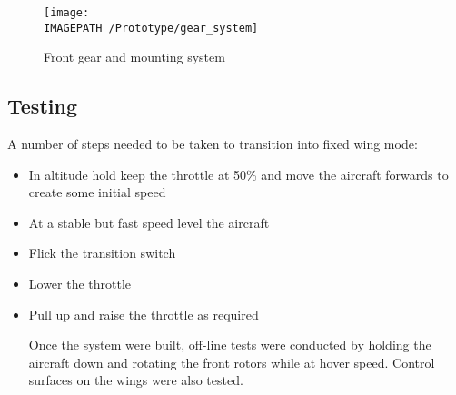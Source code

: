 \begin{figure}[!ht]
	\centering
	\texttt{[image: \\IMAGEPATH /Prototype/gear\_system]}
	\caption{Front gear and mounting system}
	\label{fig:gearsys}
\end{figure}

\subsection{Testing}
A number of steps needed to be taken to transition into fixed wing mode: 

\begin{itemize}
\item In altitude hold keep the throttle at 50\% and move the aircraft forwards to create some initial speed
\item At a stable but fast speed level the aircraft
\item Flick the transition switch 
\item Lower the throttle
\item Pull up and raise the throttle as required

Once the system were built, off-line tests were conducted by holding the aircraft down and rotating the front rotors while at hover speed. Control surfaces on the wings were also tested. 

		
\end{itemize}
